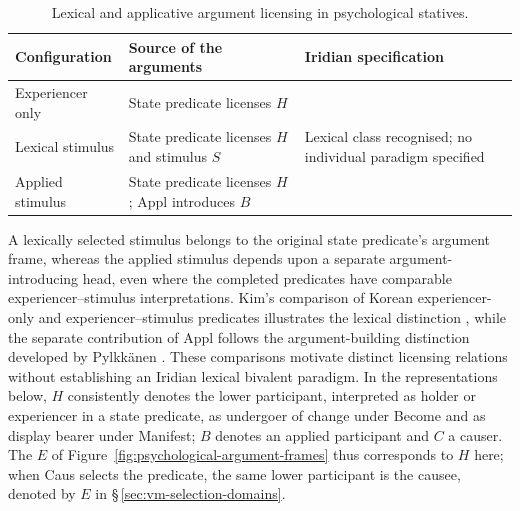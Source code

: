\begin{table}[htbp]
\footnotesize
\caption{Lexical and applicative argument licensing in psychological statives.}
\label{tab:stative-syntactic-arguments}
\begin{tabularx}{\textwidth}{L L L}
\toprule
Configuration & Source of the arguments & Iridian specification \\
\midrule
Experiencer only & State predicate licenses $H$ &  \\
Lexical stimulus & State predicate licenses $H$ and stimulus $S$
  & Lexical class recognised; no individual paradigm specified \\
Applied stimulus & State predicate licenses $H$; Appl introduces $B$
  &  \\
\bottomrule
\end{tabularx}
\end{table}

A lexically selected stimulus belongs to the original state predicate's
argument frame, whereas the applied stimulus depends upon a separate
argument-introducing head, even where the completed predicates have
comparable experiencer--stimulus interpretations. Kim's comparison of
Korean experiencer-only and experiencer--stimulus predicates illustrates
the lexical distinction \cite[abstract]{kimyoonshin2026}, while the
separate contribution of Appl follows the argument-building distinction
developed by Pylkkänen \cite[ch.~2]{pylkkanen2008}. These comparisons
motivate distinct licensing relations without establishing an Iridian
lexical bivalent paradigm. In the representations below, $H$ consistently
denotes the lower participant, interpreted as holder or experiencer in a
state predicate, as undergoer of change under Become and as display bearer
under Manifest; $B$ denotes an applied participant and $C$ a causer. The $E$ of
Figure~\ref{fig:psychological-argument-frames} thus corresponds to $H$
here; when Caus selects the predicate, the same lower participant is the
causee, denoted by $E$ in §\,\ref{sec:vm-selection-domains}.

